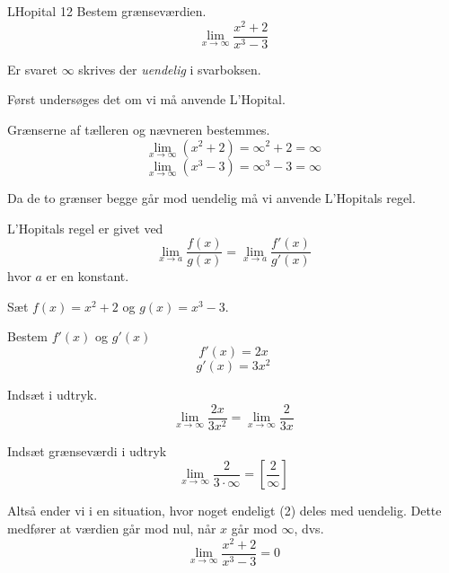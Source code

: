 \documentclass{article}
\begin{document}
\begin{exercise}{LHopital 12}
Bestem grænseværdien.
\[
\lim_{x \to \infty} \frac{x^2 + 2}{x^3 - 3}
\]

Er svaret $\infty$ skrives der \emph{uendelig} i svarboksen.


\hint
Først undersøges det om vi må anvende L'Hopital.

\hint
Grænserne af tælleren og nævneren bestemmes.
\[
\lim_{x \to \infty} (x^2 + 2) = \infty ^2 + 2 = \infty
\]
\[
\lim_{x \to \infty} (x^3 - 3) = \infty ^3 - 3 = \infty
\]

\hint
Da de to grænser begge går mod uendelig må vi anvende L'Hopitals regel.

\hint
L'Hopitals regel er givet ved
\[
\lim_{x \to a} \frac{f(x)}{g(x)} = \lim_{x \to a} \frac{f'(x)}{g'(x)}
\]
hvor $a$ er en konstant.

\hint
Sæt $f(x) = x^2 + 2$ og $g(x) = x^3 - 3$.

\hint
Bestem $f'(x)$ og $g'(x)$
\[
f'(x) = 2x
\]
\[
g'(x) = 3x^2
\]

\hint
Indsæt i udtryk.
\[
\lim_{x \to \infty} \frac{2x}{3x^2} = \lim_{x \to \infty} \frac{2}{3x}
\]

\hint
Indsæt grænseværdi i udtryk
\[
\lim_{x \to \infty} \frac{2}{3 \cdot \infty} = \left[ \frac{2}{\infty} \right]
\]

\hint
Altså ender vi i en situation, hvor noget endeligt (2) deles med uendelig. Dette medfører at værdien går mod nul, når $x$ går mod $\infty$, dvs.
\[
\lim_{x \to \infty} \frac{x^2 + 2}{x^3 - 3} = 0
\]

\end{exercise}
\end{document}
